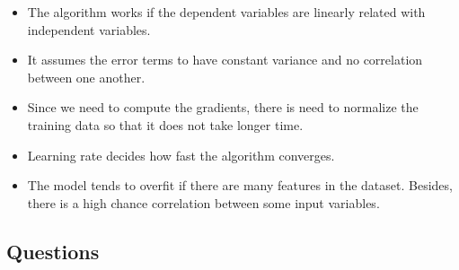 \documentclass[12pt,letterpaper, onecolumn]{exam}
\begin{document}
\begin{itemize}
\item The algorithm works if the dependent variables are linearly related with independent variables.
\item It assumes the error terms to have constant variance and no correlation between one another.
\item Since we need to compute the gradients, there is need to normalize the training data so that it does not take longer time.
\item Learning rate decides how fast the algorithm converges.
\item The model tends to overfit if there are many features in the dataset. Besides, there is a high chance correlation between some input variables.
\end{itemize}

\subsection*{Questions}
\end{document}
